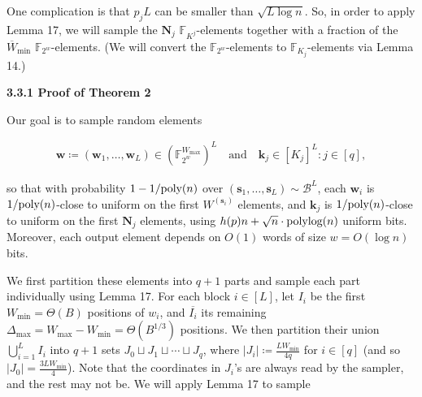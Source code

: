 One complication is that $p_{j}L$ can be smaller than $\sqrt{L\log n}$.
So, in order to apply Lemma 17, we will sample the $\boldsymbol{N}_{j}$ $\mathbb{F}_{K^{j}}$-elements together with a fraction of the $\overline{W}_{\min}$ $\mathbb{F}_{2^{w}}$-elements.
(We will convert the $\mathbb{F}_{2^{w}}$-elements to $\mathbb{F}_{K_{j}}$-elements via Lemma 14.)\par




\par\medskip\noindent\textbf{
3.3.1 Proof of Theorem 2
}\par




Our goal is to sample random elements\par


\[\begin{gathered}
\boldsymbol{w}\coloneq(\boldsymbol{w}_{1},\ldots,\boldsymbol{w}_{L})\in(\mathbb{F}_{2^{w}}^{W_{\max}})^{L}\quad\text{and}\quad\boldsymbol{k}_{j}\in[K_{j}]^{L}:j\in[q],
\end{gathered}\]


so that with probability $1-1/\textnormal{poly}(n)$ over $(\boldsymbol{s}_{1},\ldots,\boldsymbol{s}_{L})\sim\mathcal{B}^{L}$, each $\boldsymbol{w}_{i}$ is $1/\textnormal{poly}(n)$-close to uniform on the first $W^{(\boldsymbol{s}_{i})}$ elements, and $\boldsymbol{k}_{j}$ is $1/\textnormal{poly}(n)$-close to uniform on the first $\boldsymbol{N}_{j}$ elements, using $h(p)n+\sqrt{n}\cdot\textnormal{polylog}(n)$ uniform bits.
Moreover, each output element depends on $O(1)$ words of size $w=O(\log n)$ bits.\par




We first partition these elements into $q+1$ parts and sample each part individually using Lemma 17.
For each block $i\in[L]$, let $I_{i}$ be the first $W_{\min}=\Theta(B)$ positions of $w_{i}$, and $\overline{I_{i}}$ its remaining $\Delta_{\max}=W_{\max}-W_{\min}=\Theta(B^{1/3})$ positions.
We then partition their union $\bigcup_{i=1}^{L}I_{i}$ into $q+1$ sets $J_{0}\sqcup J_{1}\sqcup\cdots\sqcup J_{q}$, where $\lvert J_{i}\rvert\coloneq\frac{LW_{\min}}{4q}$ for $i\in[q]$ (and so $\lvert J_{0}\rvert=\frac{3LW_{\min}}{4}$).
Note that the coordinates in $J_{i}$’s are always read by the sampler, and the rest may not be.
We will apply Lemma 17 to sample\par


